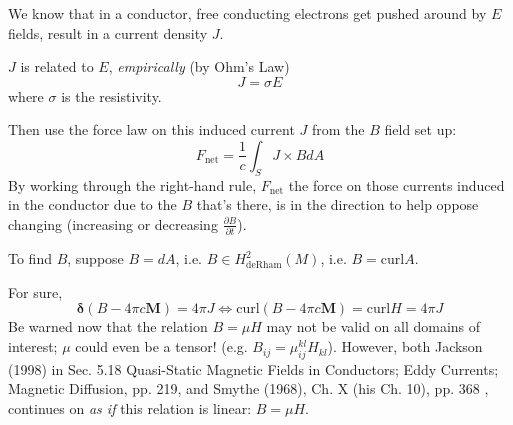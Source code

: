 \documentclass[10pt]{amsart}
\begin{document}
\begin{multicols*}{2}
We know that in a conductor, free conducting electrons get pushed around by $E$ fields, result in a current density $J$.  

$J$ is related to $E$, \emph{empirically} (by Ohm's Law)
\[
J = \sigma E
\]
where $\sigma$ is the resistivity.  

Then use the force law on this induced current $J$ from the $B$ field set up:
\[
F_{\text{net}} = \frac{1}{c} \int_S J\times B dA
\]
By working through the right-hand rule, $F_{\text{net}}$ the force on those currents induced in the conductor due to the $B$ that's there, is in the direction to help oppose changing (increasing or decreasing $\frac{\partial B}{ \partial t}$).  

To find $B$, suppose $B=dA$, i.e. $B\in H^2_{\text{deRham}}(M)$, i.e. $B=\text{curl}A$.  

For sure, 
\[
\mathbf{\delta} (B-4\pi c \mathbf{M}) = 4\pi J \Longleftrightarrow \text{curl}(B-4\pi c \mathbf{M} ) = \text{curl} H = 4\pi J
\]
Be warned now that the relation $B=\mu H$ may not be valid on all domains of interest; $\mu$ could even be a tensor! (e.g. $B_{ij} = \mu^{kl}_{ij} H_{kl}$).  However, both Jackson (1998) \cite{Jack1998} in Sec. 5.18 Quasi-Static Magnetic Fields in Conductors; Eddy Currents; Magnetic Diffusion, pp. 219, and Smythe (1968), Ch. X (his Ch. 10), pp. 368 \cite{Smyt1968}, continues on \emph{as if} this relation is linear: $B=\mu H$.  


\end{multicols*}
\end{document}
